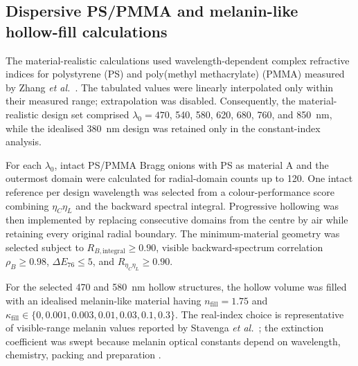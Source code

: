\subsection{Dispersive PS/PMMA and melanin-like hollow-fill calculations}
The material-realistic calculations used wavelength-dependent complex refractive indices for polystyrene (PS) and poly(methyl methacrylate) (PMMA) measured by Zhang \textit{et al.}\ \cite{Zhang2020PolymerComplexRefractiveIndices}. The tabulated values were linearly interpolated only within their measured range; extrapolation was disabled. Consequently, the material-realistic design set comprised $\lambda_0=470$, 540, 580, 620, 680, 760, and 850~nm, while the idealised 380~nm design was retained only in the constant-index analysis.

For each $\lambda_0$, intact PS/PMMA Bragg onions with PS as material A and the outermost domain were calculated for radial-domain counts up to 120. One intact reference per design wavelength was selected from a colour-performance score combining $\eta_C\eta_L$ and the backward spectral integral. Progressive hollowing was then implemented by replacing consecutive domains from the centre by air while retaining every original radial boundary. The minimum-material geometry was selected subject to $R_{B,\mathrm{integral}}\ge0.90$, visible backward-spectrum correlation $\rho_B\ge0.98$, $\Delta E_{76}\le5$, and $R_{\eta_C\eta_L}\ge0.90$.

For the selected 470 and 580~nm hollow structures, the hollow volume was filled with an idealised melanin-like material having $n_{\mathrm{fill}}=1.75$ and $\kappa_{\mathrm{fill}}\in\{0,0.001,0.003,0.01,0.03,0.1,0.3\}$. The real-index choice is representative of visible-range melanin values reported by Stavenga \textit{et al.}\ \cite{Stavenga2015MelaninRefractiveIndex}; the extinction coefficient was swept because melanin optical constants depend on wavelength, chemistry, packing and preparation \cite{Li2020SyntheticMelaninOpticalConstants}.
